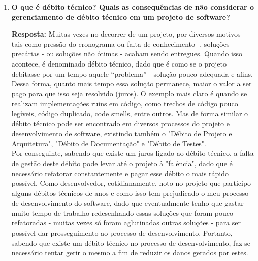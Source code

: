 \documentclass[12pt, a4paper]{article}
\newcommand{\tb}[1]{\textbf{#1}}
\newcommand{\question}[1]{\item \tb{#1}}
\newcommand{\answer}[1]{\par \tb{Resposta:} #1}
\newcommand{\quotes}[1]{``#1''}
\begin{document}
\begin{enumerate}[label=\textbf{\arabic*.}]
        \question{O que é débito técnico? Quais as consequências de não considerar o gerenciamento de débito técnico em um projeto de software?}
        \answer{
            Muitas vezes no decorrer de um projeto, por diversos motivos - tais como pressão do cronograma ou falta de conhecimento -, soluções precárias - ou soluções não ótimas - acabam sendo entregues. Quando isso acontece, é denominado débito técnico, dado que é como se o projeto debitasse por um tempo aquele \quotes{problema} - solução pouco adequada e afins. Dessa forma, quanto mais tempo essa solução permanece, maior o valor a ser pago para que isso seja resolvido (juros). O exemplo mais claro é quando se realizam implementações ruins em código, como trechos de código pouco legíveis, código duplicado, code smells, entre outros. Mas de forma similar o débito técnico pode ser encontrado em diversos processos do projeto e desenvolvimento de software, existindo também o "Débito de Projeto e Arquitetura", "Débito de Documentação" e "Débito de Testes". \\
            Por conseguinte, sabendo que existe um juros ligado ao débito técnico, a falta de gestão deste débito pode levar até o projeto à "falência", dado que é necessário refatorar constantemente e pagar esse débito o mais rápido possível. Como desenvolvedor, cotidianamente, noto no projeto que participo alguns débitos técnicos de anos e como isso tem prejudicado o meu processo de desenvolvimento do software, dado que eventualmente tenho que gastar muito tempo de trabalho redesenhando essas soluções que foram pouco refatoradas - muitas vezes só foram aglutinadas outras soluções - para ser possível dar prosseguimento ao processo de desenvolvimento. Portanto, sabendo que existe um débito técnico no processo de desenvolvimento, faz-se necessário tentar gerir o mesmo a fim de reduzir os danos gerados por estes.  
        } \newpage
        

\end{enumerate}
\end{document}

